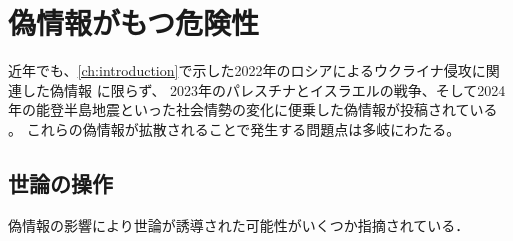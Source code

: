 



\section{偽情報がもつ危険性}
近年でも、\cref{ch:introduction}で示した2022年のロシアによるウクライナ侵攻に関連した偽情報 \cite{evon_2022}に限らず、
2023年のパレスチナとイスラエルの戦争、そして2024年の能登半島地震といった社会情勢の変化に便乗した偽情報が投稿されている \cite{Press_2023,noto}。
これらの偽情報が拡散されることで発生する問題点は多岐にわたる。

\subsection{世論の操作}
偽情報の影響により世論が誘導された可能性がいくつか指摘されている．

